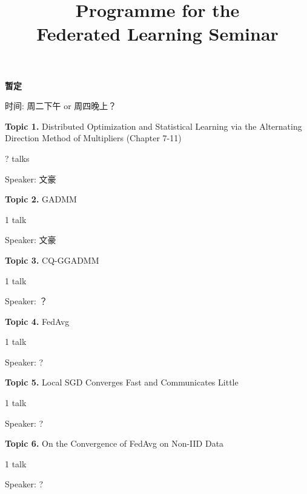 


\title{\Huge Programme for the \\ Federated Learning Seminar}
\author{}
\date{}

\maketitle

{\bfseries \large 暂定}

\vspace{1em}

时间: 周二下午 or 周四晚上？

\vspace{2em}

{\bfseries \large Topic 1.} Distributed Optimization and Statistical Learning via the Alternating Direction Method of Multipliers (Chapter 7-11) \cite{boyd2011distributed}

? talks

Speaker: 文豪

\vspace{2em}

{\bfseries \large Topic 2.} GADMM \cite{elgabli2020gadmm}

1 talk

Speaker: 文豪

\vspace{2em}

{\bfseries \large Topic 3.} CQ-GGADMM \cite{issaid2020cq-ggadmm}

1 talk

Speaker: ？

\vspace{2em}

{\bfseries \large Topic 4.} FedAvg \cite{mcmahan2017fed_avg}

1 talk

Speaker: ?

\vspace{2em}

{\bfseries \large Topic 5.} Local SGD Converges Fast and Communicates Little \cite{stich2018local}

1 talk

Speaker: ?

\vspace{2em}

{\bfseries \large Topic 6.} On the Convergence of FedAvg on Non-IID Data \cite{li2019convergence}

1 talk

Speaker: ?

